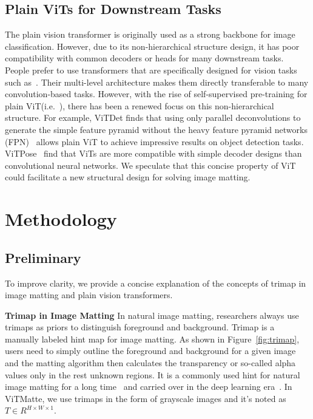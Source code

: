 \documentclass[10pt,twocolumn,letterpaper]{article}
\newcommand{\thename}{ViTMatte}
\begin{document}
\subsection{Plain ViTs for Downstream Tasks}
The plain vision transformer is originally used as a strong backbone for image classification\cite{vit}. However, due to its non-hierarchical structure design, it has poor compatibility with common decoders or heads for many downstream tasks. People prefer to use transformers that are specifically designed for vision tasks such as~\cite{swin, PVT, T2T,heo2021rethinking,fan2021multiscale}. Their multi-level architecture makes them directly transferable to many convolution-based tasks. However, with the rise of self-supervised pre-training for plain ViT(i.e.~\cite{he2022masked}), there has been a renewed focus on this non-hierarchical structure. For example, ViTDet\cite{vitdet} finds that using only parallel deconvolutions to generate the simple feature pyramid without the heavy feature pyramid networks (FPN)~\cite{fpn} allows plain ViT to achieve impressive results on object detection tasks.  ViTPose~\cite{vitpose} find that ViTs are more compatible with simple decoder designs than convolutional neural networks. We speculate that this concise property of ViT could facilitate a new structural design for solving image matting.



\section{Methodology} 

\subsection{Preliminary}
To improve clarity, we provide a concise explanation of the concepts of trimap in image matting and plain vision transformers.

\textbf{Trimap in Image Matting} 
In natural image matting, researchers always use trimaps as priors to distinguish foreground and background. Trimap is a manually labeled hint map for image matting. As shown in Figure~\ref{fig:trimap}, users need to simply outline the foreground and background for a given image and the matting algorithm then calculates the transparency or so-called alpha values only in the rest unknown regions. It is a commonly used hint for natural image matting for a long time~\cite{knn, closed-form} and carried over in the deep learning era~\cite{matteformer, rmat, transmatting}. In \thename{}, we use trimaps in the form of grayscale images and it's noted as $T\in R^{H\times W\times 1}$.
\end{document}
